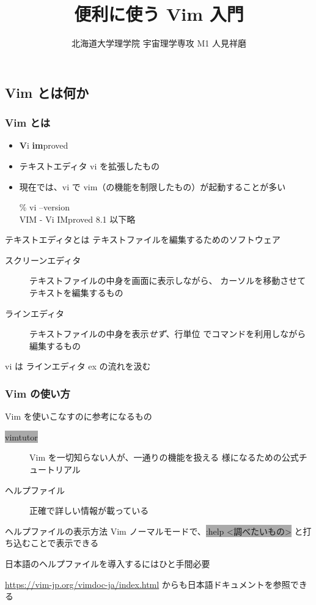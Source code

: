 \documentclass[unicode,aspectratio=1610,colorlinks,handout]{beamer}
\title{便利に使う Vim 入門}
\author{北海道大学理学院 宇宙理学専攻 M1 人見祥磨}
\date{\warekitoday}
\newcommand{\typecommand}[1]{\colorbox{darkgray}{{\ttfamily\color{lime}#1}}}
\begin{document}
\rubyusejghost %

\frame{\maketitle}

\begin{frame}
	\section{Vim とは何か}
\end{frame}

\begin{frame}
	\frametitle{Vim とは}
	\begin{itemize}
		\item \textbf{V}i \textbf{im}proved
		\item テキストエディタ vi を拡張したもの
		\item 現在では、vi で vim（の機能を制限したもの）が起動することが多い
			\begin{hmcommandbox}
				\% vi --version\\
				VIM - Vi IMproved 8.1 {\scriptsize 以下略}
			\end{hmcommandbox}
	\end{itemize}
	
	\begin{block}{テキストエディタとは}
		テキストファイルを編集するためのソフトウェア
		\begin{description}
			\item[スクリーンエディタ] テキストファイルの中身を画面に表示しながら、
				カーソルを移動させてテキストを編集するもの
			\item[ラインエディタ] テキストファイルの中身を表示\emph{せず}、行単位
				でコマンドを利用しながら編集するもの
		\end{description}
		
		vi は ラインエディタ ex の流れを汲む
	\end{block}
\end{frame}

\begin{frame}
	\frametitle{Vim の使い方}
	\begin{block}{Vim を使いこなすのに参考になるもの}
		\begin{description}
			\item[\typecommand{vimtutor}] Vim を一切知らない人が、一通りの機能を扱える
				様になるための公式チュートリアル
			\item[ヘルプファイル] 正確で詳しい情報が載っている
		\end{description}
	\end{block}
	
	\begin{block}{ヘルプファイルの表示方法}
		Vim ノーマルモードで、\typecommand{:help <調べたいもの>} と打ち込むことで表示できる
		
		日本語のヘルプファイルを導入するにはひと手間必要
		
		\url{https://vim-jp.org/vimdoc-ja/index.html} からも日本語ドキュメントを参照できる
	\end{block}
\end{frame}
\end{document}
